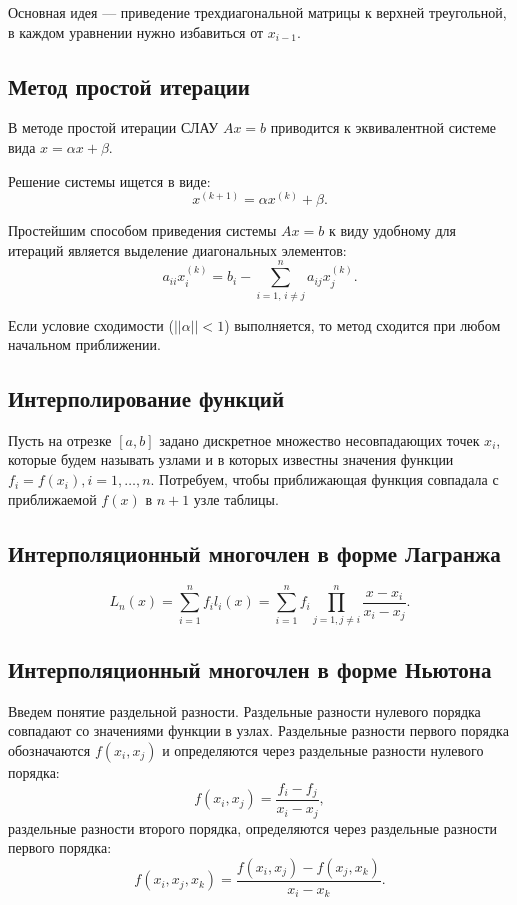\documentclass[12pt]{report}
\theoremstyle{definition}
\begin{document}
Основная идея --- приведение трехдиагональной матрицы к верхней треугольной,
в каждом уравнении нужно избавиться от $x_{i-1}$.

\subsection{Метод простой итерации}

В методе простой итерации СЛАУ $Ax = b$ приводится к эквивалентной
системе вида $x = \alpha x + \beta$.

Решение системы ищется в виде:
$$
x^{(k+1)} = \alpha x^{(k)} + \beta.
$$

Простейшим способом приведения системы $Ax = b$ к виду удобному
для итераций является выделение диагональных элементов:
$$
a_{ii} x^{(k)}_i = b_i - \sum\limits_{i = 1, \, i\ne j}^n a_{ij} x_j^{(k)}.
$$

Если условие сходимости ($||\alpha|| < 1$) выполняется, то
метод сходится при любом начальном приближении.


\subsection{Интерполирование функций}

Пусть на отрезке $[a, b]$ задано дискретное множество несовпадающих точек
$x_i$, которые будем называть узлами и в которых известны значения функции
$f_i = f(x_i), i = 1, \dots, n$. Потребуем, чтобы приближающая функция
совпадала с приближаемой $f(x)$ в $n+1$ узле таблицы.  

\subsection{Интерполяционный многочлен в форме Лагранжа}
$$
L_n(x) = \sum_{i = 1}^n f_i l_i(x) = 
\sum_{i = 1}^n f_i \prod\limits_{j=1, j \ne i}^n \dfrac{x - x_i}{x_i - x_j}.
$$

\subsection{Интерполяционный многочлен в форме Ньютона}
Введем понятие раздельной разности. Раздельные разности нулевого
порядка совпадают со значениями функции в узлах. Раздельные разности
первого порядка обозначаются $f(x_i, x_j)$ и определяются через
раздельные разности нулевого порядка:
$$
f(x_i, x_j) = \dfrac{f_i - f_j}{x_i - x_j},
$$
раздельные разности второго порядка, определяются через раздельные
разности первого порядка:
$$
f(x_i, x_j, x_k) = \dfrac{f(x_i, x_j) - f(x_j, x_k)}{x_i - x_k}.
$$
\end{document}
